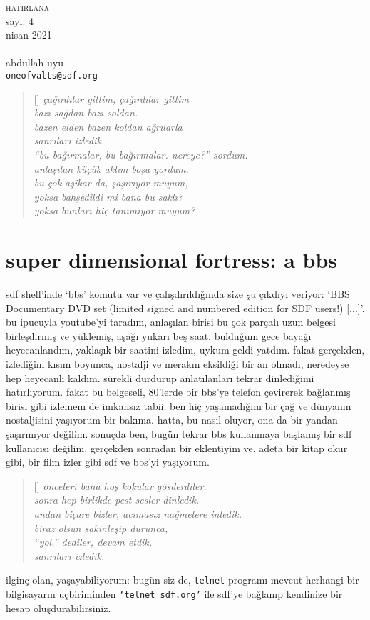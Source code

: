 \documentclass[9pt, a5paper, twocolumn, openright]{memoir}
\begin{document}
\thispagestyle{plain}
\noindent
{\HUGE\textsc{hatirlana}\\\small{}sayı: 4\\nisan 2021}\\\\
{\small{}abdullah uyu\\\texttt{oneofvalts@sdf.org}}
\bigskip
{}
\begin{verse}[\versewidth]
  \itshape{}
  çağırdılar gittim, çağırdılar gittim\\
  bazı sağdan bazı soldan.\\
  bazen elden bazen koldan ağrılarla\\
  sanrıları izledik.\\
  ``bu bağırmalar, bu bağırmalar. nereye?'' sordum.\\
  anlaşılan küçük aklım boşa yordum.\\
  bu çok aşikar da, şaşırıyor muyum,\\
  yoksa bahşedildi mi bana bu saklı?\\
  yoksa bunları hiç tanımıyor muyum?\\
\end{verse}
\section{super dimensional fortress: a bbs}
sdf shell'inde {\ttfamily `bbs'} komutu var ve çalışdırıldığında size şu
çıkdıyı veriyor: {\ttfamily `BBS  Documentary   DVD  set  (limited signed
  and  numbered edition  for SDF users!) [...]'}. bu ipucuyla youtube'yi
taradım, anlaşılan birisi bu çok parçalı uzun belgesi birleşdirmiş ve
yüklemiş, aşağı yukarı beş saat. bulduğum gece bayağı heyecanlandım,
yaklaşık bir saatini izledim, uykum geldi yatdım. fakat gerçekden,
izlediğim kısım boyunca, nostalji ve merakın eksildiği bir an olmadı,
neredeyse hep heyecanlı kaldım. sürekli durdurup anlatılanları tekrar
dinlediğimi hatırlıyorum. fakat bu belgeseli, 80'lerde bir bbs'ye telefon
çevirerek bağlanmış birisi gibi izlemem de imkansız tabii. ben hiç
yaşamadığım bir çağ ve dünyanın nostaljisini yaşıyorum bir bakıma.
hatta, bu nasıl oluyor, ona da bir yandan şaşırmıyor değilim. sonuçda
ben, bugün tekrar bbs kullanmaya başlamış bir sdf kullanıcısı değilim,
gerçekden sonradan bir eklentiyim ve, adeta bir kitap okur gibi, bir film
izler gibi sdf ve bbs'yi yaşıyorum.
\begin{verse}[\versewidth]
  \itshape{}
  önceleri bana hoş kokular gösderdiler.\\
  sonra hep birlikde pest sesler dinledik.\\
  andan biçare bizler, acımasız nağmelere inledik.\\
  biraz olsun sakinleşip durunca,\\
  ``yol.'' dediler, devam etdik,\\
  sanrıları izledik.\\
\end{verse}
ilginç olan, yaşayabiliyorum: bugün
siz de, \texttt{telnet} programı mevcut herhangi bir bilgisayarın
uçbiriminden \texttt{`telnet sdf.org'} ile sdf'ye bağlanıp kendinize bir
hesap oluşdurabilirsiniz.
\end{document}
